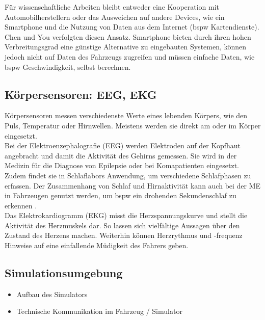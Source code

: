 {Für wissenschaftliche Arbeiten bleibt entweder eine Kooperation mit Automobilherstellern oder das Ausweichen auf andere Devices, wie ein Smartphone und die Nutzung von Daten aus dem Internet (\acl{bspw} Kartendienste). Chen \cite{Chen:2015:ISV:2742647.2742659} und You \cite{You:2013:CAA:2462456.2465428} verfolgten diesen Ansatz. Smartphone bieten durch ihren hohen Verbreitungsgrad eine günstige Alternative zu eingebauten Systemen, können jedoch nicht auf Daten des Fahrzeugs zugreifen und müssen einfache Daten, wie \acl{bspw} Geschwindigkeit, selbst berechnen.

\subsection{Körpersensoren: EEG, EKG}
\label{sec:sens}
Körpersensoren messen verschiedenste Werte eines lebenden Körpers, wie den Puls, Temperatur oder Hirnwellen. Meistens werden sie direkt am oder im Körper eingesetzt.\\

Bei der Elektroenzephalografie (EEG) werden Elektroden auf der Kopfhaut angebracht und damit die Aktivität des Gehirns gemessen. Sie wird in der Medizin für die Diagnose von Epilepsie oder bei Komapatienten eingesetzt. Zudem findet sie in Schlaflabors Anwendung, um verschiedene Schlafphasen zu erfassen. Der Zusammenhang von Schlaf und Hirnaktivität kann auch bei der \acl{ME} in Fahrzeugen genutzt werden, um \acl{bspw} ein drohenden Sekundenschlaf zu erkennen \cite{Santamaria_eeg}.\\

Das Elektrokardiogramm (EKG) misst die Herzspannungskurve und stellt die Aktivität des Herzmuskels dar. So lassen sich vielfältige Aussagen über den Zustand des Herzens machen. Weiterhin können Herzrythmus und -frequenz Hinweise auf eine einfallende Müdigkeit des Fahrers geben. 


\subsection{Simulationsumgebung}
\label{sec:sim}
\begin{itemize}
  \item Aufbau des Simulators
  \item Technische Kommunikation im Fahrzeug / Simulator \cite{serial}
\end{itemize}



}
